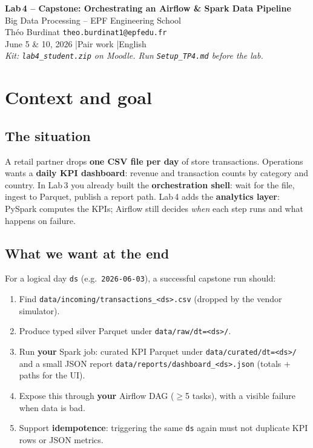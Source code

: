 \documentclass[11pt,a4paper]{article}
\begin{document}
\begin{center}
  {\huge\bfseries\color{eblue} Lab\,4 -- Capstone: Orchestrating an Airflow \& Spark Data Pipeline}\\[8pt]
  {\large Big Data Processing -- EPF Engineering School}\\[6pt]
  {\normalsize Th\'eo Burdinat \quad\texttt{theo.burdinat1@epfedu.fr}}\\[4pt]
  {\normalsize June 5 \& 10, 2026 \quad|\quad Pair work \quad|\quad English}\\[6pt]
  {\small\textit{Kit: \texttt{lab4\_student.zip} on Moodle. Run \texttt{Setup\_TP4.md} before the lab.}}
\end{center}

\section*{Context and goal}
\label{sec:context}

\subsection*{The situation}

A retail partner drops \textbf{one CSV file per day} of store transactions.
Operations wants a \textbf{daily KPI dashboard}: revenue and transaction counts by category and country.
In Lab\,3 you already built the \textbf{orchestration shell}: wait for the file, ingest to Parquet, publish a report path.
Lab\,4 adds the \textbf{analytics layer}: PySpark computes the KPIs; Airflow still decides \emph{when} each step runs and what happens on failure.

\subsection*{What we want at the end}

For a logical day \texttt{ds} (e.g.\ \texttt{2026-06-03}), a successful capstone run should:

\begin{enumerate}[nosep]
  \item Find \texttt{data/incoming/transactions\_<ds>.csv} (dropped by the vendor simulator).
  \item Produce typed silver Parquet under \texttt{data/raw/dt=<ds>/}.
  \item Run \textbf{your} Spark job: curated KPI Parquet under \texttt{data/curated/dt=<ds>/} and a small JSON report
        \texttt{data/reports/dashboard\_<ds>.json} (totals + paths for the UI).
  \item Expose this through \textbf{your} Airflow DAG ($\geq$5 tasks), with a visible failure when data is bad.
  \item Support \textbf{idempotence}: triggering the same \texttt{ds} again must not duplicate KPI rows or JSON metrics.
\end{enumerate}
\end{document}

